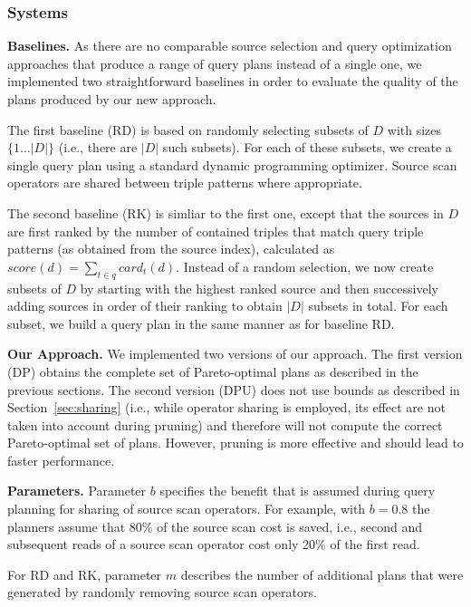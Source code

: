 \subsubsection{Systems}

\textbf{Baselines.} As there are no comparable source selection and
query optimization approaches that produce a range of query plans
instead of a single one, we implemented two straightforward baselines
in order to evaluate the quality of the plans produced by our new
approach. 

The first baseline (RD) is based on randomly selecting subsets of $D$
with sizes $\{1\ldots |D|\}$ (i.e., there are $|D|$ such subsets). For
each of these subsets, we create a single query plan using a standard
dynamic programming optimizer. Source scan operators are shared
between triple patterns where appropriate.

The second baseline (RK) is simliar to the first one, except that the
sources in $D$ are first ranked by the number of contained triples
that match query triple patterns (as obtained from the source index),
calculated as $score(d) = \sum_{t \in q} card_t(d)$. Instead of a
random selection, we now create subsets of $D$ by starting with the
highest ranked source and then successively adding sources in order of
their ranking to obtain $|D|$ subsets in total. For each subset, we
build a query plan in the same manner as for baseline RD.


\textbf{Our Approach.} We implemented two versions of our
approach. The first version (DP) obtains the complete set of
Pareto-optimal plans as described in the previous sections. The second
version (DPU) does not use bounds as described in
Section~\ref{sec:sharing} (i.e., while operator sharing is employed,
its effect are not taken into account during pruning) and therefore
will not compute the correct Pareto-optimal set of plans. However,
pruning is more effective and should lead to faster performance.

\textbf{Parameters.} Parameter $b$ specifies the benefit that is
assumed during query planning for sharing of source scan
operators. For example, with $b=0.8$ the planners assume that 80\% of
the source scan cost is saved, i.e., second and subsequent reads of a
source scan operator cost only 20\% of the first read.

For RD and RK, parameter $m$ describes the number of additional plans
that were generated by randomly removing source scan operators.

